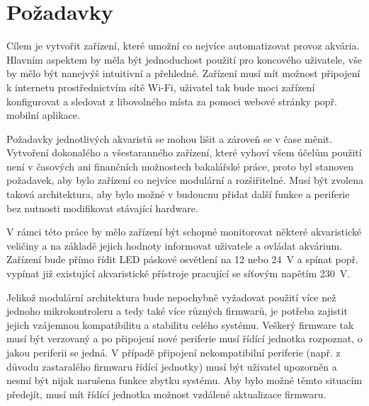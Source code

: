 \section{Požadavky}
\label{sec:pozadavky}
    Cílem je vytvořit zařízení, které umožní co nejvíce automatizovat provoz akvária. Hlavním aspektem by měla být jednoduchost použití pro koncového uživatele, vše by mělo být nanejvýš intuitivní a přehledné. Zařízení musí mít možnost připojení k internetu prostřednictvím sítě Wi-Fi, uživatel tak bude moci zařízení konfigurovat a sledovat z libovolného místa za pomoci webové stránky popř. mobilní aplikace.

    Požadavky jednotlivých akvaristů se mohou lišit a zároveň se v čase měnit. Vytvoření dokonalého a všestaranného zařízení, které vyhoví všem účelům použití není v časových ani finančních možnostech bakalářské práce, proto byl stanoven požadavek, aby bylo zařízení co nejvíce modulární a rozšiřitelné. Musí být zvolena taková architektura, aby bylo možné v budoucnu přidat další funkce a periferie bez nutnosti modifikovat stávající hardware.

    V rámci této práce by mělo zařízení být schopné monitorovat některé akvaristické veličiny a na základě jejich hodnoty informovat uživatele a ovládat akvárium. Zařízení bude přímo řídit LED páskové osvětlení na 12 nebo \qty{24}{V} a spínat popř. vypínat již existující akvaristické přístroje pracující se síťovým napětím \qty{230}{V}.  

    Jelikož modulární architektura bude nepochybně vyžadovat použití více než jednoho mikrokontroleru a tedy také více různých firmwarů, je potřeba zajistit jejich vzájemnou kompatibilitu a stabilitu celého systému. Veškerý firmware tak musí být verzovaný a po připojení nové periferie musí řídící jednotka rozpoznat, o jakou periferii se jedná. V případě připojení nekompatibilní periferie (např. z důvodu zastaralého firmwaru řídící jednotky) musí být uživatel upozorněn a nesmí být nijak narušena funkce zbytku systému. Aby bylo možné těmto situacím předejít, musí mít řídící jednotka možnost vzdálené aktualizace firmwaru.
